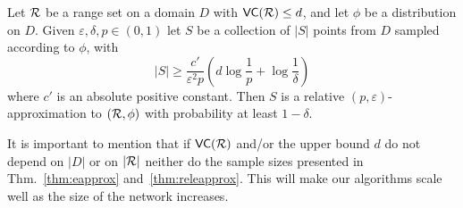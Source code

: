 \begin{theorem}\label{thm:releapprox}
  Let $\mathcal{R}$ be a range set on a domain $D$ with
  $\mathsf{VC}(\mathcal{R})\le d$, and let $\phi$ be a distribution on $D$. Given
  $\varepsilon,\delta,p\in(0,1)$ let $S$ be a collection of $|S|$ points from $D$
  sampled according to $\phi$, with 
  \begin{equation}\label{eq:releapprox}
    |S|\ge\frac{c'}{\varepsilon^2p}\left(d\log\frac{1}{p}+\log\frac{1}{\delta}\right)
  \end{equation}
  where $c'$ is an absolute positive constant. Then $S$ is a relative
  $(p,\varepsilon)$-approximation to $(\mathcal{R},\phi)$ with probability at least
  $1-\delta$.
\end{theorem}

It is important to mention that if $\mathsf{VC}(\mathcal{R})$ and/or the upper bound $d$ do
not depend on $|D|$ or on $|\mathcal{R}|$ neither do the sample sizes presented in
Thm.~\ref{thm:eapprox} and~\ref{thm:releapprox}. This will make our algorithms
scale well as the size of the network increases.

